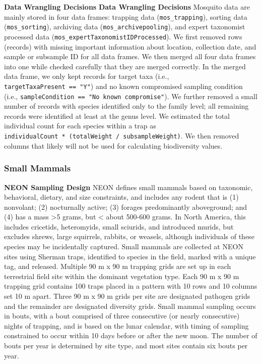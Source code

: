 \documentclass[
  12pt,
]{article}
\begin{document}
\textbf{Data Wrangling Decisions} \textbf{Data Wrangling Decisions} Mosquito data are mainly stored in four data frames: trapping data (\texttt{mos\_trapping}), sorting data (\texttt{mos\_sorting}), archiving data (\texttt{mos\_archivepooling}), and expert taxonomist processed data (\texttt{mos\_expertTaxonomistIDProcessed}). We first removed rows (records) with missing important information about location, collection date, and sample or subsample ID for all data frames. We then merged all four data frames into one while checked carefully that they are merged correctly. In the merged data frame, we only kept records for target taxa (i.e., \texttt{targetTaxaPresent\ ==\ "Y"}) and no known compromised sampling condition (i.e., \texttt{sampleCondition\ ==\ "No\ known\ compromise"}). We further removed a small number of records with species identified only to the family level; all remaining records were identified at least at the genus level. We estimated the total individual count for each species within a trap as \texttt{individualCount\ *\ (totalWeight\ /\ subsampleWeight)}. We then removed columns that likely will not be used for calculating biodiversity values.

\hypertarget{small-mammals}{%
\subsubsection{Small Mammals}\label{small-mammals}}

\textbf{NEON Sampling Design} NEON defines small mammals based on taxonomic, behavioral, dietary, and size constraints, and includes any rodent that is (1) nonvolant; (2) nocturnally active; (3) forages predominantly aboveground; and (4) has a mass \textgreater5 grams, but \textless{} about 500-600 grams. In North America, this includes cricetids, heteromyids, small sciurids, and introduced murids, but excludes shrews, large squirrels, rabbits, or weasels, although individuals of these species may be incidentally captured. Small mammals are collected at NEON sites using Sherman traps, identified to species in the field, marked with a unique tag, and released. Multiple 90 m x 90 m trapping grids are set up in each terrestrial field site within the dominant vegetation type. Each 90 m x 90 m trapping grid contains 100 traps placed in a pattern with 10 rows and 10 columns set 10 m apart. Three 90 m x 90 m grids per site are designated pathogen grids and the remainder are designated diversity grids. Small mammal sampling occurs in bouts, with a bout comprised of three consecutive (or nearly consecutive) nights of trapping, and is based on the lunar calendar, with timing of sampling constrained to occur within 10 days before or after the new moon. The number of bouts per year is determined by site type, and most sites contain six bouts per year.
\end{document}
